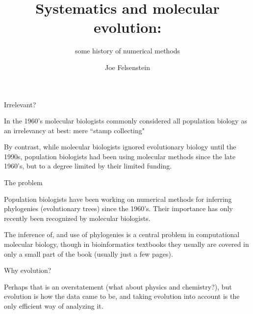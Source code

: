 \documentclass[pdf,bluish,slideColor,colorBG]{prosper}
\title{Systematics and molecular evolution:}
\subtitle{some history of numerical methods}
\author{Joe Felsenstein}
\begin{document}
\def\Prob{{\rm Prob\;}}
\def\prob{{\rm \;Prob\;}}


\maketitle

\begin{slide}[Replace]{Irrelevant?}

In the 1960's molecular biologists commonly considered all population
biology as an irrelevancy at best: mere ``stamp collecting"

\bigskip

\centerline{}

\bigskip

By contrast, while molecular biologists ignored evolutionary biology until
the 1990s,
population biologists had been using molecular methods since the
late 1960's, but to a degree limited by their limited funding.

\end{slide}

\begin{slide}[Replace]{The problem}

Population biologists have been working on numerical methods for
inferring phylogenies (evolutionary trees) since the 1960's.  Their
importance has
only recently been recognized by molecular biologists.

The inference of, and use of phylogenies is a central problem in
computational molecular biology, though in bioinformatics textbooks
they usually are covered in only a small part of the book (usually
just a few pages).

\end{slide}

\begin{slide}[Replace]{Why evolution?}

\begin{center}
\end{center}
\bigskip

\bigskip

Perhaps that is an overstatement (what about physics and chemistry?), but evolution is how
the data came to be, and taking evolution into account is the only efficient
way of analyzing it.

\end{slide}
\end{document}
